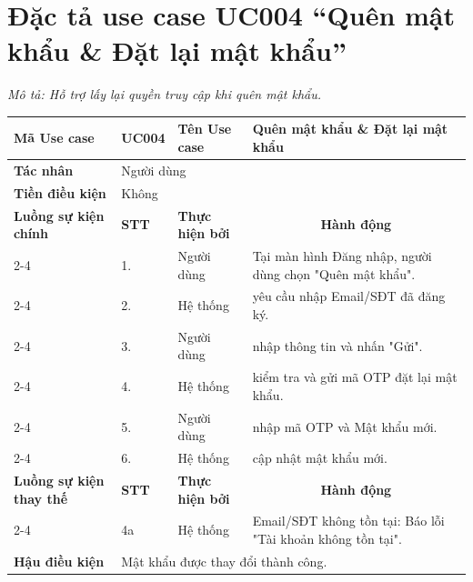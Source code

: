 \endgroup

\section{Đặc tả use case UC004 ``Quên mật khẩu \& Đặt lại mật khẩu''}
\textit{Mô tả: Hỗ trợ lấy lại quyền truy cập khi quên mật khẩu.}
\vspace{0.5cm}

\begingroup
\renewcommand{\arraystretch}{1.5}

\begin{longtable}{|p{2.7cm}|p{0.8cm}|p{2.6cm}|p{7.3cm}|}
\hline
\cellcolor[HTML]{D5F5E3}\textbf{Mã Use case} & \multicolumn{1}{l|}{UC004} & \cellcolor[HTML]{D5F5E3}\textbf{Tên Use case} & Quên mật khẩu \& Đặt lại mật khẩu \\ \hline
\cellcolor[HTML]{D5F5E3}\textbf{Tác nhân} & \multicolumn{3}{p{10.7cm}|}{Người dùng} \\ \hline
\cellcolor[HTML]{D5F5E3}\textbf{Tiền điều kiện} & \multicolumn{3}{p{10.7cm}|}{Không} \\ \hline

\cellcolor[HTML]{D5F5E3}\textbf{Luồng sự kiện chính} & \cellcolor[HTML]{FDEBD0}\textbf{STT} & \cellcolor[HTML]{FDEBD0}\textbf{Thực hiện bởi} & \multicolumn{1}{c|}{\cellcolor[HTML]{FDEBD0}\textbf{Hành động}} \\ \cline{2-4} 
\cellcolor[HTML]{D5F5E3} & 1. & Người dùng & Tại màn hình Đăng nhập, người dùng chọn "Quên mật khẩu". \\ \cline{2-4} 
\cellcolor[HTML]{D5F5E3} & 2. & Hệ thống & yêu cầu nhập Email/SĐT đã đăng ký. \\ \cline{2-4} 
\cellcolor[HTML]{D5F5E3} & 3. & Người dùng & nhập thông tin và nhấn "Gửi". \\ \cline{2-4} 
\cellcolor[HTML]{D5F5E3} & 4. & Hệ thống & kiểm tra và gửi mã OTP đặt lại mật khẩu. \\ \cline{2-4} 
\cellcolor[HTML]{D5F5E3} & 5. & Người dùng & nhập mã OTP và Mật khẩu mới. \\ \cline{2-4} 
\cellcolor[HTML]{D5F5E3} & 6. & Hệ thống & cập nhật mật khẩu mới. \\ \hline

\cellcolor[HTML]{D5F5E3}\textbf{Luồng sự kiện thay thế} & \cellcolor[HTML]{FDEBD0}\textbf{STT} & \cellcolor[HTML]{FDEBD0}\textbf{Thực hiện bởi} & \multicolumn{1}{c|}{\cellcolor[HTML]{FDEBD0}\textbf{Hành động}} \\ \cline{2-4} 
\cellcolor[HTML]{D5F5E3} & 4a & Hệ thống & Email/SĐT không tồn tại: Báo lỗi "Tài khoản không tồn tại". \\ \hline

\cellcolor[HTML]{D5F5E3}\textbf{Hậu điều kiện} & \multicolumn{3}{p{10.7cm}|}{Mật khẩu được thay đổi thành công.} \\ \hline
\end{longtable}
\endgroup

